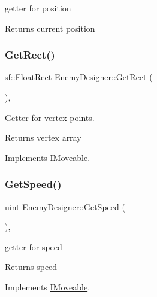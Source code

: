 getter for position 

\begin{DoxyReturn}{Returns}
current position 
\end{DoxyReturn}
\mbox{\label{class_enemy_designer_a1dc87f5766601115601c20de865ef6d7}} 
\subsubsection{\texorpdfstring{Get\+Rect()}{GetRect()}}
{\footnotesize\ttfamily sf\+::\+Float\+Rect Enemy\+Designer\+::\+Get\+Rect (\begin{DoxyParamCaption}{ }\end{DoxyParamCaption})\hspace{0.3cm}{\ttfamily [override]}, {\ttfamily [virtual]}}



Getter for vertex points. 

\begin{DoxyReturn}{Returns}
vertex array 
\end{DoxyReturn}


Implements \mbox{\hyperlink{class_i_moveable}{I\+Moveable}}.

\mbox{\label{class_enemy_designer_a857e6d38180ed66dacb0ba8bfcd02173}} 
\subsubsection{\texorpdfstring{Get\+Speed()}{GetSpeed()}}
{\footnotesize\ttfamily uint Enemy\+Designer\+::\+Get\+Speed (\begin{DoxyParamCaption}{ }\end{DoxyParamCaption})\hspace{0.3cm}{\ttfamily [override]}, {\ttfamily [virtual]}}



getter for speed 

\begin{DoxyReturn}{Returns}
speed 
\end{DoxyReturn}


Implements \mbox{\hyperlink{class_i_moveable}{I\+Moveable}}.

